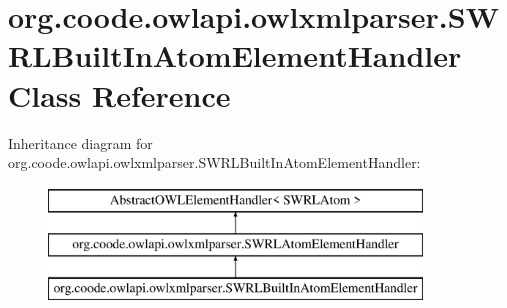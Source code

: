 \hypertarget{classorg_1_1coode_1_1owlapi_1_1owlxmlparser_1_1_s_w_r_l_built_in_atom_element_handler}{\section{org.\-coode.\-owlapi.\-owlxmlparser.\-S\-W\-R\-L\-Built\-In\-Atom\-Element\-Handler Class Reference}
\label{classorg_1_1coode_1_1owlapi_1_1owlxmlparser_1_1_s_w_r_l_built_in_atom_element_handler}
}
Inheritance diagram for org.\-coode.\-owlapi.\-owlxmlparser.\-S\-W\-R\-L\-Built\-In\-Atom\-Element\-Handler\-:\begin{figure}[H]
\begin{center}
\leavevmode
\includegraphics[height=3.000000cm]{classorg_1_1coode_1_1owlapi_1_1owlxmlparser_1_1_s_w_r_l_built_in_atom_element_handler}
\end{center}
\end{figure}
